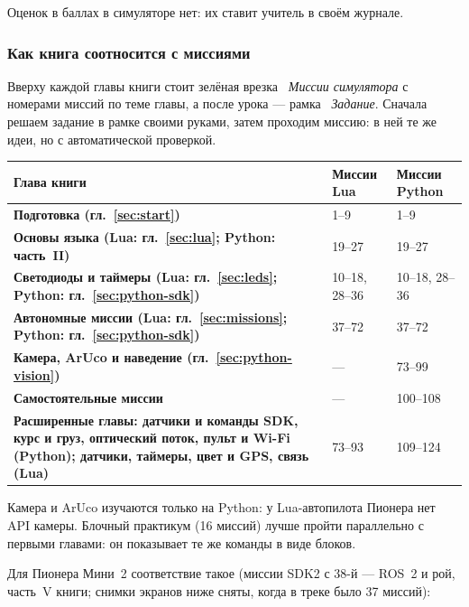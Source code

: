 Оценок в баллах в симуляторе нет: их ставит учитель в своём журнале.

\subsubsection{Как книга соотносится с миссиями}

Вверху каждой главы книги стоит зелёная врезка \faGamepad\ \textit{Миссии симулятора} с номерами миссий по теме главы, а после урока --- рамка \faPencilAlt\ \textit{Задание}. Сначала решаем задание в рамке своими руками, затем проходим миссию: в ней те же идеи, но с автоматической проверкой.

\begin{center}
\small
\begin{tabularx}{\linewidth}{@{}>{\bfseries}X X X@{}}
\toprule
Глава книги & Миссии Lua & Миссии Python \\
\midrule
Подготовка (гл.~\ref{sec:start}) & 1--9 & 1--9 \\
Основы языка (Lua: гл.~\ref{sec:lua}; Python: часть~II) & 19--27 & 19--27 \\
Светодиоды и таймеры (Lua: гл.~\ref{sec:leds}; Python: гл.~\ref{sec:python-sdk}) & 10--18, 28--36 & 10--18, 28--36 \\
Автономные миссии (Lua: гл.~\ref{sec:missions}; Python: гл.~\ref{sec:python-sdk}) & 37--72 & 37--72 \\
Камера, ArUco и наведение (гл.~\ref{sec:python-vision}) & --- & 73--99 \\
Самостоятельные миссии & --- & 100--108 \\
Расширенные главы: датчики и команды SDK, курс и груз, оптический поток, пульт и Wi-Fi (Python); датчики, таймеры, цвет и GPS, связь (Lua) & 73--93 & 109--124 \\
\bottomrule
\end{tabularx}
\end{center}

Камера и ArUco изучаются только на Python: у Lua-автопилота Пионера нет API камеры. Блочный практикум (16 миссий) лучше пройти параллельно с первыми главами: он показывает те же команды в виде блоков.

Для Пионера Мини~2 соответствие такое (миссии SDK2 с 38-й --- ROS~2 и рой, часть~V книги; снимки экранов ниже сняты, когда в треке было 37 миссий):


